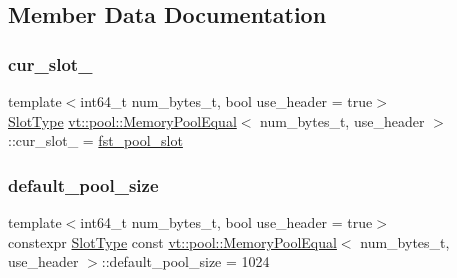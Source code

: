 \subsection{Member Data Documentation}
\mbox{\label{structvt_1_1pool_1_1_memory_pool_equal_aeb14c73621125dc7d9179833bbc780a7}} 
\subsubsection{\texorpdfstring{cur\+\_\+slot\+\_\+}{cur\_slot\_}}
{\footnotesize\ttfamily template$<$int64\+\_\+t num\+\_\+bytes\+\_\+t, bool use\+\_\+header = true$>$ \\
\hyperlink{structvt_1_1pool_1_1_memory_pool_equal_af05a2c24c95c666b20e3758745be746b}{Slot\+Type} \hyperlink{structvt_1_1pool_1_1_memory_pool_equal}{vt\+::pool\+::\+Memory\+Pool\+Equal}$<$ num\+\_\+bytes\+\_\+t, use\+\_\+header $>$\+::cur\+\_\+slot\+\_\+ = \hyperlink{structvt_1_1pool_1_1_memory_pool_equal_a11e4d0dbd2ea5c1f93fa8cdf36c1e60a}{fst\+\_\+pool\+\_\+slot}\hspace{0.3cm}{\ttfamily [private]}}

\mbox{\label{structvt_1_1pool_1_1_memory_pool_equal_a8daca02e94e9ab587670808525561c71}} 
\subsubsection{\texorpdfstring{default\+\_\+pool\+\_\+size}{default\_pool\_size}}
{\footnotesize\ttfamily template$<$int64\+\_\+t num\+\_\+bytes\+\_\+t, bool use\+\_\+header = true$>$ \\
constexpr \hyperlink{structvt_1_1pool_1_1_memory_pool_equal_af05a2c24c95c666b20e3758745be746b}{Slot\+Type} const \hyperlink{structvt_1_1pool_1_1_memory_pool_equal}{vt\+::pool\+::\+Memory\+Pool\+Equal}$<$ num\+\_\+bytes\+\_\+t, use\+\_\+header $>$\+::default\+\_\+pool\+\_\+size = 1024\hspace{0.3cm}{\ttfamily [static]}}

